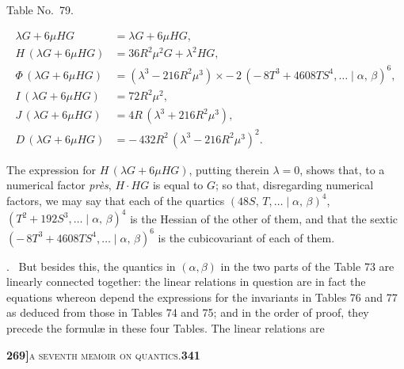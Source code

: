 \documentclass[11pt]{article}
\newcommand{\Cdel}{\mid}
\begin{document}
\begin{center}Table No.~79.\end{center}
\[
\begin{aligned}
   \lambda G + 6\mu H G &= \lambda G + 6\mu H G,\\
   H\,(\lambda G + 6\mu H G) &= 36 R^2\mu^2 G + \lambda^2 H G,\\
   \Phi\,(\lambda G + 6\mu H G) &= (\lambda^3 - 216 R^2\mu^3)\times -\,2\,(-\,8 T^3 + 4608 T S^4,\ldots\Cdel\alpha,\,\beta)^6,\\
   I\,(\lambda G + 6\mu H G) &= 72 R^2\mu^2,\\
   J\,(\lambda G + 6\mu H G) &= 4 R\,(\lambda^3 + 216 R^2\mu^3),\\
   D\,(\lambda G + 6\mu H G) &= -\,432 R^2\,(\lambda^3 - 216 R^2\mu^3)^2.
\end{aligned}
\]

\medskip

\noindent The expression for $H\,(\lambda G + 6\mu H G)$, putting therein $\lambda = 0$, shows that, to a numerical factor \textit{pr\`es}, $H\cdot H G$ is equal to $G$; so that, disregarding numerical factors, we may say that each of the quartics $(48 S,\,T,\ldots\Cdel\alpha,\,\beta)^4$, $(T^2 + 192 S^3,\ldots\Cdel\alpha,\,\beta)^4$ is the Hessian of the other of them, and that the sextic $(-\,8 T^3 + 4608 T S^4,\ldots\Cdel\alpha,\,\beta)^6$ is the cubicovariant of each of them.

\medskip

. \ But besides this, the quantics in $(\alpha, \beta)$ in the two parts of the Table 73 are linearly connected together: the linear relations in question are in fact the equations whereon depend the expressions for the invariants in Tables 76 and 77 as deduced from those in Tables 74 and 75; and in the order of proof, they precede the formul\ae{} in these four Tables. The linear relations are

\newpage
\setcounter{page}{341}

\noindent\textbf{269]}\hfill\textsc{a seventh memoir on quantics.}\hfill\textbf{341}
\end{document}
